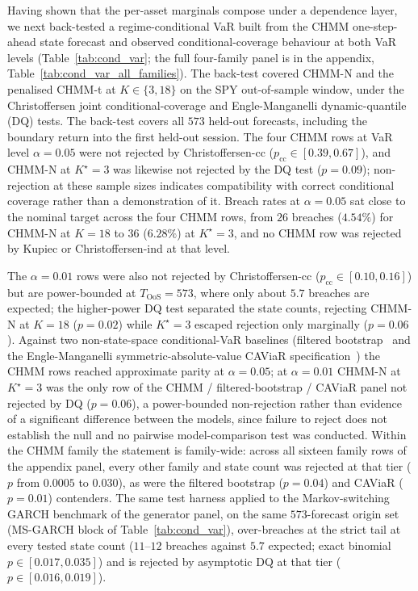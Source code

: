 Having shown that the per-asset marginals compose under a dependence layer, we next back-tested a regime-conditional VaR built from the CHMM one-step-ahead state forecast and observed conditional-coverage behaviour at both VaR levels (Table~\ref{tab:cond_var}; the full four-family panel is in the appendix, Table~\ref{tab:cond_var_all_families}). The back-test covered CHMM-N and the penalised CHMM-t at $K \in \{3, 18\}$ on the SPY out-of-sample window, under the Christoffersen joint conditional-coverage and Engle-Manganelli dynamic-quantile (DQ) tests. The back-test covers all $573$ held-out forecasts, including the boundary return into the first held-out session. The four CHMM rows at VaR level $\alpha = 0.05$ were not rejected by Christoffersen-cc ($p_{\text{cc}} \in [0.39, 0.67]$), and CHMM-N at $K^\star = 3$ was likewise not rejected by the DQ test ($p = 0.09$); non-rejection at these sample sizes indicates compatibility with correct conditional coverage rather than a demonstration of it. Breach rates at $\alpha = 0.05$ sat close to the nominal target across the four CHMM rows, from $26$ breaches ($4.54\%$) for CHMM-N at $K = 18$ to $36$ ($6.28\%$) at $K^\star = 3$, and no CHMM row was rejected by Kupiec or Christoffersen-ind at that level.

The $\alpha = 0.01$ rows were also not rejected by Christoffersen-cc ($p_{\text{cc}} \in [0.10, 0.16]$) but are power-bounded at $T_{\text{OoS}} = 573$, where only about $5.7$ breaches are expected; the higher-power DQ test separated the state counts, rejecting CHMM-N at $K = 18$ ($p = 0.02$) while $K^\star = 3$ escaped rejection only marginally ($p = 0.06$). Against two non-state-space conditional-VaR baselines (filtered bootstrap~\cite{barone1999var} and the Engle-Manganelli symmetric-absolute-value CAViaR specification~\cite{engle2004caviar}) the CHMM rows reached approximate parity at $\alpha = 0.05$; at $\alpha = 0.01$ CHMM-N at $K^\star = 3$ was the only row of the CHMM / filtered-bootstrap / CAViaR panel not rejected by DQ ($p = 0.06$), a power-bounded non-rejection rather than evidence of a significant difference between the models, since failure to reject does not establish the null and no pairwise model-comparison test was conducted. Within the CHMM family the statement is family-wide: across all sixteen family rows of the appendix panel, every other family and state count was rejected at that tier ($p$ from $0.0005$ to $0.030$), as were the filtered bootstrap ($p = 0.04$) and CAViaR ($p = 0.01$) contenders. The same test harness applied to the Markov-switching GARCH benchmark of the generator panel, on the same $573$-forecast origin set (MS-GARCH block of Table~\ref{tab:cond_var}), over-breaches at the strict tail at every tested state count ($11$--$12$ breaches against $5.7$ expected; exact binomial $p \in [0.017, 0.035]$) and is rejected by asymptotic DQ at that tier ($p \in [0.016, 0.019]$).

